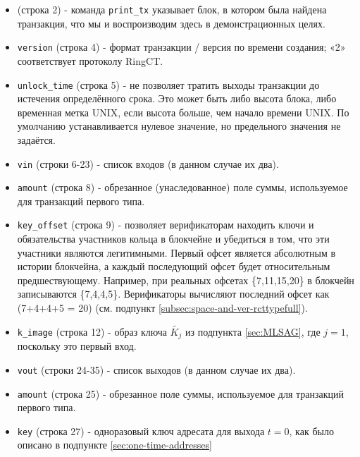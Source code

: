\begin{appendices}
\begin{itemize}
    \item (строка 2) - команда {\tt print\_tx} указывает блок, в котором была найдена транзакция, что мы и воспроизводим здесь в демонстрационных целях.
	\item {\tt version} (строка 4) - формат транзакции / версия по времени создания; «2» соответствует протоколу RingCT.
	\item {\tt unlock\_time} (строка 5) - не позволяет тратить выходы транзакции до истечения опреде\-лённого срока. Это может быть либо высота блока, либо временная метка UNIX, если высота больше, чем начало времени UNIX. По умолчанию устанавливается нулевое значение, но предельного значения не задаётся.	
	\item {\tt vin} (строки 6-23) - список входов (в данном случае их два).
	\item {\tt amount} (строка 8) - обрезанное (унаследованное) поле суммы, используемое для транзак\-ций первого типа.
	\item {\tt key\_offset} (строка 9) - позволяет верификаторам находить ключи и обязательства участников кольца в блокчейне и убедиться в том, что эти участники являются легитим\-ными. Первый офсет является абсолютным в истории блокчейна, а каждый последую\-щий офсет будет относительным предшествующему. Например, при реальных офсетах \{7,11,15,20\} в блокчейн записываются \{7,4,4,5\}. Верификаторы вычисляют последний офсет как (7+4+4+5 = 20) (см. подпункт \ref{subsec:space-and-ver-rcttypefull}).
	\item {\tt k\_image} (строка 12) - образ ключа \(\tilde{K_j}\) из подпункта \ref{sec:MLSAG}, где $j = 1$, поскольку это первый вход.
	\item {\tt vout} (строки 24-35) - список выходов (в данном случае их два).
	\item {\tt amount} (строка 25) - обрезанное поле суммы, используемое для транзакций первого типа.
	\item {\tt key} (строка 27) - одноразовый ключ адресата для выхода $t = 0$, как было описано в подпункте \ref{sec:one-time-addresses}

\end{itemize}
\end{appendices}
